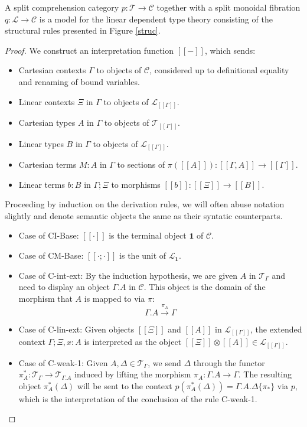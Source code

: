 \begin{thm}[Soundness]
A split comprehension category $p : \mathcal{T} \to \mathcal{C}$ together with a split monoidal fibration $q : \mathcal{L} \to \mathcal{C}$ is a model for the linear dependent type theory consisting of the structural rules presented in Figure \ref{struc}.
\begin{proof}
  We construct an interpretation function $[[-]]$, which sends:
  \begin{itemize}
  \item Cartesian contexts $\Gamma$ to objects of $\mathcal{C}$, considered up to definitional equality and renaming of bound variables.
  \item Linear contexts $\Xi$ in $\Gamma$ to objects of $\mathcal{L}_{[[\Gamma]]}$.
  \item Cartesian types $A$ in $\Gamma$ to objects of $\mathcal{T}_{[[\Gamma]]}$.
  \item Linear types $B$ in $\Gamma$ to objects of $\mathcal{L}_{[[\Gamma]]}$.
  \item Cartesian terms $M : A$ in $\Gamma$ to sections of $\pi([[A]]) : [[\Gamma,A]] \to [[\Gamma]]$.
  \item Linear terms $b : B$ in $\Gamma; \Xi$ to morphisms $[[b]] : [[\Xi]] \to [[B]]$.
  \end{itemize}
Proceeding by induction on the derivation rules, we will often abuse notation slightly and denote semantic objects the same as their syntatic counterparts.
\begin{itemize}
\item Case of CI-Base: $[[\cdot]]$ is the terminal object $\mathbf{1}$ of $\mathcal{C}$.
\item Case of CM-Base: $[[\cdot; \cdot]]$ is the unit of $\mathcal{L}_{\mathbf{1}}$.
\item Case of C-int-ext: By the induction hypothesis, we are given $A$ in $\mathcal{T}_{\Gamma}$ and need to display an object $\Gamma.A$ in $\mathcal{C}$. This object is the domain of the morphism that $A$ is mapped to via $\pi$:
  \[\Gamma.A \xrightarrow {\pi_A} \Gamma\]
\item Case of C-lin-ext: Given objects $[[\Xi]]$ and $[[A]]$ in $\mathcal{L}_{[[\Gamma]]}$, the extended context $\Gamma; \Xi, x : A$ is interpreted as the object $[[\Xi]] \otimes [[A]] \in \mathcal{L}_{[[\Gamma]]}$.
\item Case of C-weak-1: Given $A, \Delta \in \mathcal{T}_{\Gamma}$, we send $\Delta$ through the functor $\pi_A^* : \mathcal{T}_\Gamma \to \mathcal{T}_{\Gamma.A}$ induced by lifting the morphism $\pi_A : \Gamma.A \to \Gamma$. The resulting object $\pi_A^*(\Delta)$ will be sent to the context $p(\pi_A^*(\Delta)) = \Gamma.A.\Delta\{\pi_*\}$ via $p$, which is the interpretation of the conclusion of the rule C-weak-1.

\end{itemize}
\end{proof}
\end{thm}
